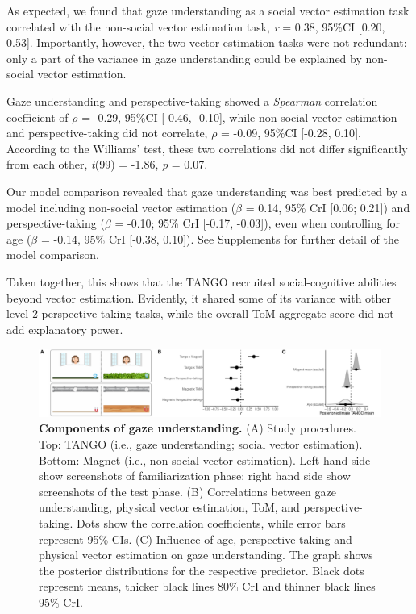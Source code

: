 \documentclass[
  man,mask,floatsintext]{apa6}
\begin{document}
As expected, we found that gaze understanding as a social vector estimation task correlated with the non-social vector estimation task, \emph{r} = 0.38, 95\%CI {[}0.20, 0.53{]}. Importantly, however, the two vector estimation tasks were not redundant: only a part of the variance in gaze understanding could be explained by non-social vector estimation.

Gaze understanding and perspective-taking showed a \emph{Spearman} correlation coefficient of \(\rho\) = -0.29, 95\%CI {[}-0.46, -0.10{]}, while non-social vector estimation and perspective-taking did not correlate, \(\rho\) = -0.09, 95\%CI {[}-0.28, 0.10{]}. According to the Williams' test, these two correlations did not differ significantly from each other, \emph{t}(99) = -1.86, \emph{p} = 0.07.

Our model comparison revealed that gaze understanding was best predicted by a model including non-social vector estimation (\(\beta\) = 0.14, 95\% CrI {[}0.06; 0.21{]}) and perspective-taking (\(\beta\) = -0.10; 95\% CrI {[}-0.17, -0.03{]}), even when controlling for age (\(\beta\) = -0.14, 95\% CrI {[}-0.38, 0.10{]}). See Supplements for further detail of the model comparison.

Taken together, this shows that the TANGO recruited social-cognitive abilities beyond vector estimation. Evidently, it shared some of its variance with other level 2 perspective-taking tasks, while the overall ToM aggregate score did not add explanatory power.



\begin{figure}

{\centering \includegraphics[width=1\linewidth]{../figures/magnet_plot} 

}

\caption{\textbf{Components of gaze understanding.} (A) Study procedures. Top: TANGO (i.e., gaze understanding; social vector estimation). Bottom: Magnet (i.e., non-social vector estimation). Left hand side show screenshots of familiarization phase; right hand side show screenshots of the test phase. (B) Correlations between gaze understanding, physical vector estimation, ToM, and perspective-taking. Dots show the correlation coefficients, while error bars represent 95\% CIs. (C) Influence of age, perspective-taking and physical vector estimation on gaze understanding. The graph shows the posterior distributions for the respective predictor. Black dots represent means, thicker black lines 80\% CrI and thinner black lines 95\% CrI.}\label{fig:fig3}
\end{figure}
\end{document}
